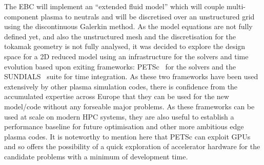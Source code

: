 \documentclass{article}
\begin{document}
The EBC will implement an ``extended fluid model'' which will couple multi-component 
plasma to neutrals and will be discretised over an unstructured grid using the 
discontinuous Galerkin method. As the model equations are not fully defined yet, 
and also the unstructured mesh and the discretisation for the tokamak geometry 
is not fully analysed, it was decided to explore the design space for a 2D reduced 
model using an infrastructure for the solvers and time evolution based upon exiting 
frameworks: PETSc~\cite{ref:15} for the solvers and the SUNDIALS~\cite{ref:16} suite for time integration. 
As these two frameworks have been used extensively by other plasma simulation codes, 
there is confidence from the accumulated expertise across Europe that they can 
be used for the new model/code without any forseable major problems. As these frameworks 
can be used at scale on modern HPC systems, they are also useful to establish a 
performance baseline for future optimisation and other more ambitious edge plasma 
codes. It is noteworthy to mention here that PETSc can exploit GPUs and so offers 
the possibility of a quick exploration of accelerator hardware for the candidate 
problems with a minimum of development time.
\end{document}
